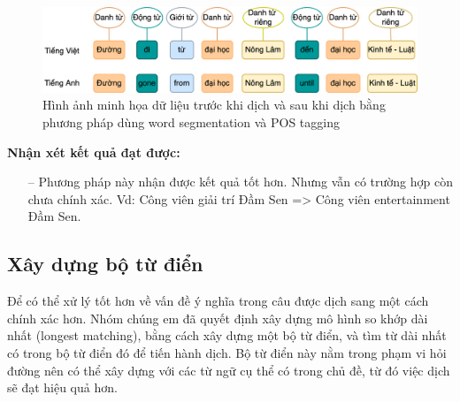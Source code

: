 \begin{figure}[htp]
    \centering
    \includegraphics[width=15cm]{images/trainingdata-wordsegment.png}
    \caption{Hình ảnh minh họa dữ liệu trước khi dịch và sau khi dịch bằng phương pháp dùng word segmentation và POS tagging}
    \label{fig:trainingdata-wordsegment}
\end{figure}

\textbf{Nhận xét kết quả đạt được:}
\begin{itemize}
    \item[--] Phương pháp này nhận được kết quả tốt hơn. Nhưng vẫn có trường hợp còn chưa chính xác. Vd: Công viên giải trí Đầm Sen => Công viên entertainment Đầm Sen.
   
\end{itemize}

\subsection{Xây dựng bộ từ điển}
Để có thể xử lý tốt hơn về vấn đề ý nghĩa trong câu được dịch sang một cách chính xác hơn. Nhóm chúng em đã quyết định xây dựng mô hình so khớp dài nhất (longest matching), bằng cách xây dựng một bộ từ điển, và tìm từ dài nhất có trong bộ từ điển đó để tiến hành dịch. Bộ từ điển này nằm trong phạm vi hỏi đường nên có thể xây dựng với các từ ngữ cụ thể có trong chủ đề, từ đó việc dịch sẽ đạt hiệu quả hơn.

